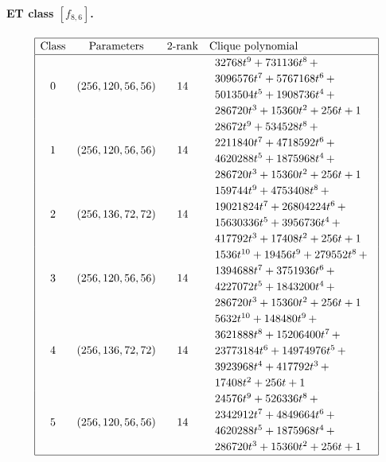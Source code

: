 \documentclass[12pt,a4paper]{article}
\begin{document}
\paragraph*{ET class $[f_{8,6}]$.}


\small{}
\begin{align*}
\def\arraystretch{1.2}
\begin{array}{|cccl|}
\hline
\text{Class} &
\text{Parameters} &
\text{2-rank} &
\text{Clique polynomial}
\\
\hline
0 &
(256, 120, 56, 56) &
14 &
\begin{array}{l}
32768t^{9} + 731136t^{8}
\,+
\\
 3096576t^{7} + 5767168t^{6}
\,+
\\
 5013504t^{5} + 1908736t^{4}
\,+
\\
 286720t^{3} + 15360t^{2} + 256t + 1
\end{array}
\\
1 &
(256, 120, 56, 56) &
14 &
\begin{array}{l}
28672t^{9} + 534528t^{8}
\,+
\\
 2211840t^{7} + 4718592t^{6}
\,+
\\
 4620288t^{5} + 1875968t^{4}
\,+
\\
 286720t^{3} + 15360t^{2} + 256t + 1
\end{array}
\\
2 &
(256, 136, 72, 72) &
14 &
\begin{array}{l}
159744t^{9} + 4753408t^{8}
\,+
\\
 19021824t^{7} + 26804224t^{6}
\,+
\\
 15630336t^{5} + 3956736t^{4}
\,+
\\
 417792t^{3} + 17408t^{2} + 256t + 1
\end{array}
\\
3 &
(256, 120, 56, 56) &
14 &
\begin{array}{l}
1536t^{10} + 19456t^{9} + 279552t^{8}
\,+
\\
 1394688t^{7} + 3751936t^{6}
\,+
\\
 4227072t^{5} + 1843200t^{4}
\,+
\\
 286720t^{3} + 15360t^{2} + 256t + 1
\end{array}
\\
4 &
(256, 136, 72, 72) &
14 &
\begin{array}{l}
5632t^{10} + 148480t^{9}
\,+
\\
 3621888t^{8} + 15206400t^{7}
\,+
\\
 23773184t^{6} + 14974976t^{5}
\,+
\\
 3923968t^{4} + 417792t^{3}
\,+
\\
 17408t^{2} + 256t + 1
\end{array}
\\
5 &
(256, 120, 56, 56) &
14 &
\begin{array}{l}
24576t^{9} + 526336t^{8}
\,+
\\
 2342912t^{7} + 4849664t^{6}
\,+
\\
 4620288t^{5} + 1875968t^{4}
\,+
\\
 286720t^{3} + 15360t^{2} + 256t + 1
\end{array}
\\
\hline
\end{array}
\end{align*}
\end{document}

